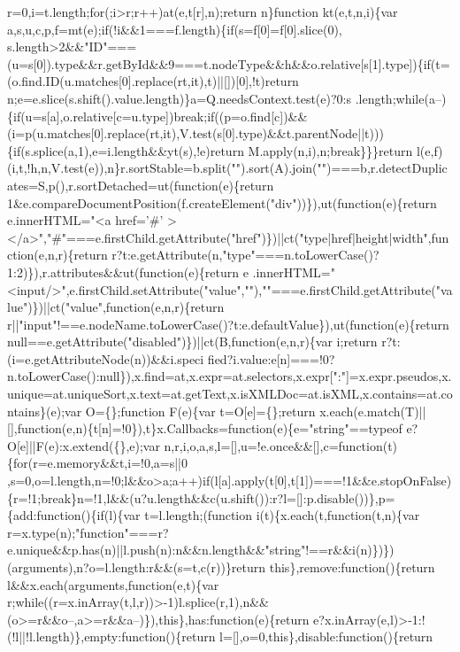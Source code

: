 \begin{DoxyCode}
{       r=0,i=t.length;for(;i>r;r++)at(e,t[r],n);return n\}function kt(e,t,n,i)\{var
       a,s,u,c,p,f=mt(e);if(!i&&1===f.length)\{if(s=f[0]=f[0].slice(0),
      s.length>2&&"ID"===(u=s[0]).type&&r.getById&&9===t.nodeType&&h&&o.relative[s[1].type])\{if(t=(o.find.ID(u.matches[0].replace(rt,it),t)||[])[0],!t)return
       n;e=e.slice(s.shift().value.length)\}a=Q.needsContext.test(e)?0:s
      .length;while(a--)\{if(u=s[a],o.relative[c=u.type])break;if((p=o.find[c])&&(i=p(u.matches[0].replace(rt,it),V.test(s[0].type)&&t.parentNode||t)))\{if(s.splice(a,1),e=i.length&&yt(s),!e)return
       M.apply(n,i),n;break\}\}\}return
       l(e,f)(i,t,!h,n,V.test(e)),n\}r.sortStable=b.split("").sort(A).join("")===b,r.detectDuplicates=S,p(),r.sortDetached=ut(function(e)\{return
       1&e.compareDocumentPosition(f.createElement("div"))\}),ut(function(e)\{return e.innerHTML="<a href='}#\textcolor{stringliteral}{'
      ></a>","#"===e.firstChild.getAttribute("href")\})||ct("type|href|height|width",function(e,n,r)\{return r?t:e.getAttribute(n,"type"===n.toLowerCase()?1:2)\}),r.attributes&&ut(function(e)\{return
       e
      .innerHTML="<input/>",e.firstChild.setAttribute("value",""),""===e.firstChild.getAttribute("value")\})||ct("value",function(e,n,r)\{return r||"input"!==e.nodeName.toLowerCase()?t:e.defaultValue\}),ut(function(e)\{return
       null==e.getAttribute("disabled")\})||ct(B,function(e,n,r)\{var i;return
       r?t:(i=e.getAttributeNode(n))&&i.speci
      fied?i.value:e[n]===!0?n.toLowerCase():null\}),x.find=at,x.expr=at.selectors,x.expr[":"]=x.expr.pseudos,x.unique=at.uniqueSort,x.text=at.getText,x.isXMLDoc=at.isXML,x.contains=at.contains\}(e);var O=\{\};function
       F(e)\{var t=O[e]=\{\};return
       x.each(e.match(T)||[],function(e,n)\{t[n]=!0\}),t\}x.Callbacks=function(e)\{e="string"==typeof e?O[e]||F(e):x.extend(\{\},e);var
       n,r,i,o,a,s,l=[],u=!e.once&&[],c=function(t)\{for(r=e.memory&&t,i=!0,a=s||0
      ,s=0,o=l.length,n=!0;l&&o>a;a++)if(l[a].apply(t[0],t[1])===!1&&e.stopOnFalse)\{r=!1;break\}n=!1,l&&(u?u.length&&c(u.shift()):r?l=[]:p.disable())\},p=\{add:function()\{if(l)\{var t=l.length;(function
       i(t)\{x.each(t,function(t,n)\{var
       r=x.type(n);"function"===r?e.unique&&p.has(n)||l.push(n):n&&n.length&&"string"!==r&&i(n)\})\})(arguments),n?o=l.length:r&&(s=t,c(r))\}return this\},remove:function()\{return l&&x.each(arguments,function(e,t)\{var
       r;while((r=x.inArray(t,l,r))>-1)l.splice(r,1),n&&(o>=r&&o--,a>=r&&a--)\}),this\},has:function(e)\{return
       e?x.inArray(e,l)>-1:!(!l||!l.length)\},empty:function()\{return l=[],o=0,this\},disable:function()\{return
}
\end{DoxyCode}
